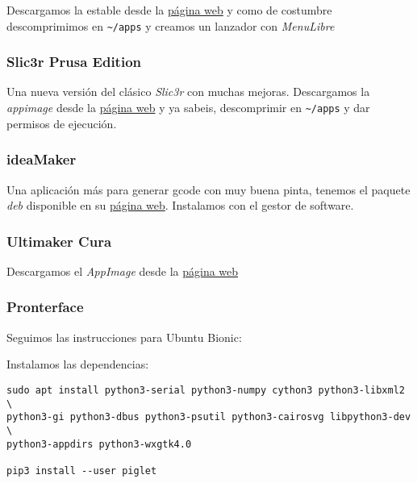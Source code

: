 \documentclass[
  12pt,
  spanish,
]{article}
\begin{document}
Descargamos la estable desde la \href{https://dl.slic3r.org}{página web}
y como de costumbre descomprimimos en \texttt{\textasciitilde{}/apps} y
creamos un lanzador con \emph{MenuLibre}

\hypertarget{slic3r-prusa-edition}{%
\subsubsection{Slic3r Prusa Edition}\label{slic3r-prusa-edition}}

Una nueva versión del clásico \emph{Slic3r} con muchas mejoras.
Descargamos la \emph{appimage} desde la
\href{https://www.prusa3d.com/slic3r-prusa-edition/}{página web} y ya
sabeis, descomprimir en \texttt{\textasciitilde{}/apps} y dar permisos
de ejecución.

\hypertarget{ideamaker}{%
\subsubsection{ideaMaker}\label{ideamaker}}

Una aplicación más para generar gcode con muy buena pinta, tenemos el
paquete \emph{deb} disponible en su
\href{https://www.raise3d.com/pages/ideamaker}{página web}. Instalamos
con el gestor de software.

\hypertarget{ultimaker-cura}{%
\subsubsection{Ultimaker Cura}\label{ultimaker-cura}}

Descargamos el \emph{AppImage} desde la
\href{https://github.com/mypaint/mypaint/releases}{página web}

\hypertarget{pronterface}{%
\subsubsection{Pronterface}\label{pronterface}}

Seguimos las instrucciones para Ubuntu Bionic:

Instalamos las dependencias:

\begin{verbatim}
sudo apt install python3-serial python3-numpy cython3 python3-libxml2 \
python3-gi python3-dbus python3-psutil python3-cairosvg libpython3-dev \
python3-appdirs python3-wxgtk4.0

pip3 install --user piglet
\end{verbatim}
\end{document}
